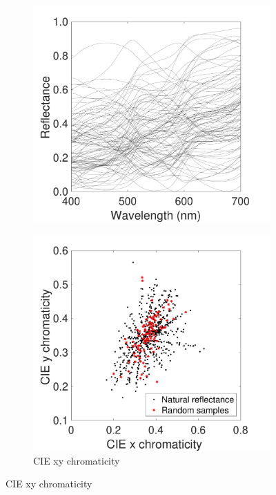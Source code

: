 \documentclass{jov}
\begin{document}
\begin{figure}
\begin{subfigure}{0.24 \textwidth}
        \includegraphics[width=\textwidth]{../FiguresDraft4/Figure7/Figure7_b.pdf}
        \label{fig:reflectanceSamples}
    \end{subfigure}
    \begin{subfigure}{0.24 \textwidth}
    \centering
    \caption{CIE xy chromaticity}
        \includegraphics[width=\textwidth]{../FiguresDraft4/Figure7/Figure7_c.pdf}

\end{subfigure}
\end{figure}
\end{document}
